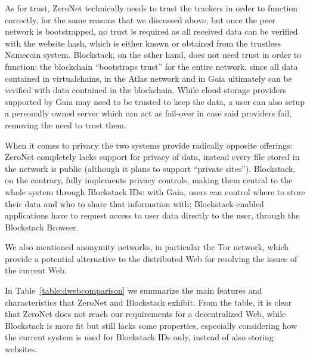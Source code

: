 \documentclass[mscthesis]{usiinfthesis}
\begin{document}
As for trust, ZeroNet technically needs to trust the trackers in order to function correctly, for the same reasons that we discussed above, but once the peer network is bootstrapped, no trust is required as all received data can be verified with the website hash, which is either known or obtained from the trustless Namecoin system. Blockstack, on the other hand, does not need trust in order to function: the blockchain ``bootstraps trust'' for the entire network, since all data contained in virtualchains, in the Atlas network and in Gaia ultimately can be verified with data contained in the blockchain. While cloud-storage providers supported by Gaia may need to be trusted to keep the data, a user can also setup a personally owned server which can act as fail-over in case said providers fail, removing the need to trust them.

When it comes to privacy the two systems provide radically opposite offerings: ZeroNet completely lacks support for privacy of data, instead every file stored in the network is public (although it plans to support ``private sites''). Blockstack, on the contrary, fully implements privacy controls, making them central to the whole system through Blockstack IDs: with Gaia, users can control where to store their data and who to share that information with; Blockstack-enabled applications have to request access to user data directly to the user, through the Blockstack Browser.

We also mentioned anonymity networks, in particular the Tor network, which provide a potential alternative to the distributed Web for resolving the issues of the current Web.

In Table~\ref{table:dwebcomparison} we summarize the main features and characteristics that ZeroNet and Blockstack exhibit. From the table, it is clear that ZeroNet does not reach our requirements for a decentralized Web, while Blockstack is more fit but still lacks some properties, especially considering how the current system is used for Blockstack IDs only, instead of also storing websites.
\end{document}
